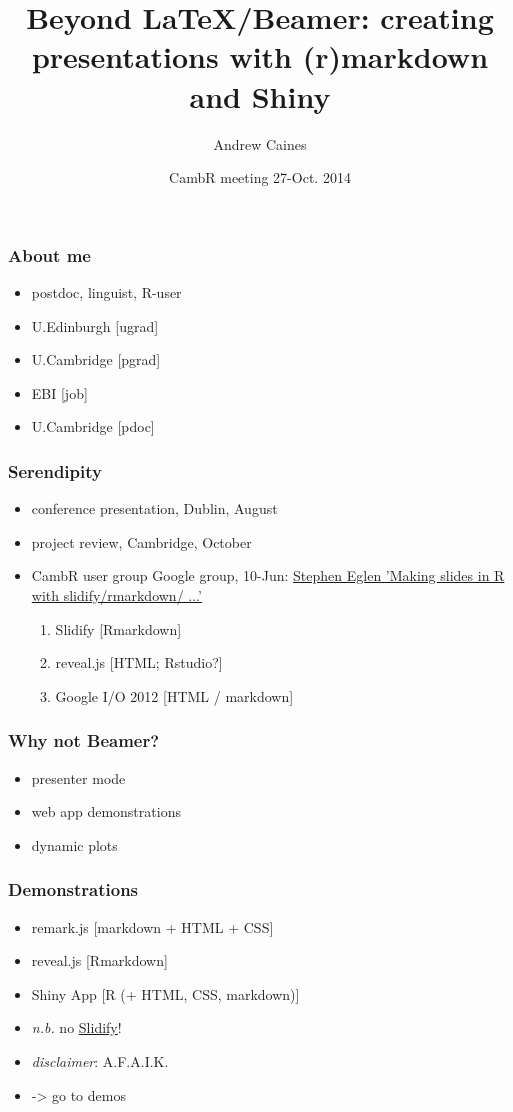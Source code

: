 \documentclass{beamer}
\title{Beyond LaTeX/Beamer: creating presentations with (r)markdown and Shiny}
\author{Andrew Caines}
\institute{ALTA Institute / DTAL, University of Cambridge}
\date{CambR meeting 27-Oct. 2014}
\begin{document}
\frame{\titlepage}

\begin{frame}
\frametitle{About me}
\begin{itemize}
\item postdoc, linguist, R-user
\pause
\item U.Edinburgh [ugrad]
\pause
\item U.Cambridge [pgrad]
\pause
\item EBI [job]
\pause
\item U.Cambridge [pdoc]
\end{itemize}
\end{frame}

\begin{frame}
\frametitle{Serendipity}
\begin{itemize}
\item conference presentation, Dublin, August
\item project review, Cambridge, October
\pause
\item CambR user group Google group, 10-Jun: \href{https://groups.google.com/d/msg/cambridge-r-user-group/yp8QJRuEaFY/1Bsb85xtqVgJ}{Stephen Eglen 'Making slides in R with slidify/rmarkdown/ ...'}
\begin{enumerate}
\item Slidify [Rmarkdown]
\item reveal.js [HTML; Rstudio?]
\item Google I/O 2012 [HTML / markdown]
\end{enumerate}
\end{itemize}
\end{frame}

\begin{frame}
\frametitle{Why not Beamer?}
\begin{itemize}
\item presenter mode
\item web app demonstrations
\item dynamic plots
\end{itemize}
\end{frame}

\begin{frame}
\frametitle{Demonstrations}
\begin{itemize}
\item remark.js [markdown + HTML + CSS]
\item reveal.js [Rmarkdown]
\item Shiny App [R (+ HTML, CSS, markdown)]
\item \emph{n.b.} no \href{http://ramnathv.github.io/slidify/}{Slidify}!
\item \emph{disclaimer}: A.F.A.I.K.
\pause
\item -> go to demos
\end{itemize}
\end{frame}
\end{document}
